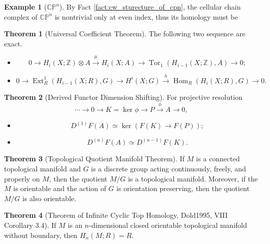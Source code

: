 \documentclass[10pt]{report}
\theoremstyle{definition}
\newtheorem{theorem}{Theorem}
\newtheorem{example}{Example}
\begin{document}
\begin{example}[$\mathbb{CP}^n$]
By Fact \ref{fact:cw_sturecture_of_cpn}, the cellular chain complex of $\mathbb{CP}^n$ is nontrivial only at even index, thus its homology must be
\end{example}

\begin{theorem}[Universal Coefficient Theorem]
The following two sequence are exact.
\begin{itemize}
\item $$0 \rightarrow H_{i}(X ; \mathbb{Z}) \otimes A \stackrel{\mu}{\rightarrow} H_{i}(X ; A) \rightarrow \operatorname{Tor}_{1}\left(H_{i-1}(X ; \mathbb{Z}), A\right) \rightarrow 0;$$
\item $$0 \rightarrow \operatorname{Ext}_{R}^{1}\left({H}_{i-1}(X ; R), G\right) \rightarrow H^{i}(X ; G) \stackrel{h}{\rightarrow} \operatorname{Hom}_{R}\left(H_{i}(X ; R), G\right) \rightarrow 0.$$
\end{itemize}
\end{theorem}

\begin{theorem}[Derived Functor Dimension Shifting]
For projective resolution $$\cdots\to0\to K=\ker\phi\to P\overset{\phi}{\to}A\to0,$$
\begin{itemize}
\item $$D^{(1)}F(A)\simeq\ker(F(K)\to F(P));$$
\item $$D^{(n)}F(A)\simeq D^{(n-1)}F(K).$$
\end{itemize}
\end{theorem}

\begin{theorem}[Topological Quotient Manifold Theorem]
If $M$ is a connected topological manifold and $G$ is a discrete group acting continuously, freely, and properly on $M$, then the quotient $M/G$ is a topological manifold. Moreover, if the $M$ is orientable and the action of $G$ is orientation preserving, then the quotient $M/G$ is also orientable.
\end{theorem}

\begin{theorem}[Theorem of Infinite Cyclic Top Homology, Dold1995, VIII Corollary 3.4]
If $M$ is an $n$-dimensional closed orientable topological manifold without boundary, then $H_n(M;R)=R$.
\end{theorem}
\end{document}
